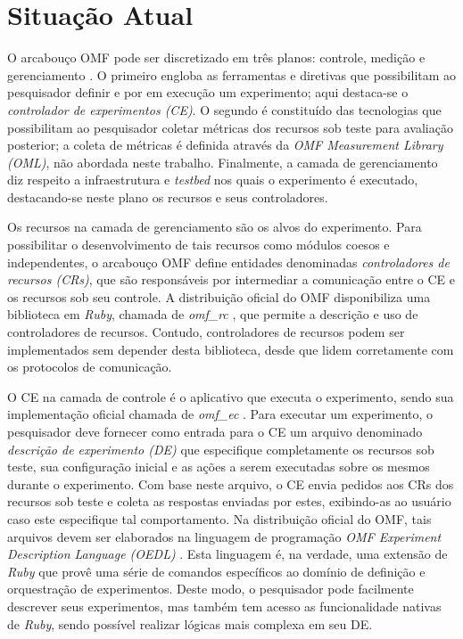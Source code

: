 
\chapter{Situa\c{c}\~ao Atual}

O arcabou\c{c}o OMF pode ser discretizado em tr\^es planos: controle, medi\c{c}\~ao e gerenciamento \cite{Rakotoarivelo2010:OCM:1713254.1713267}. O primeiro engloba as ferramentas e diretivas que possibilitam ao pesquisador definir e por em execu\c{c}\~ao um experimento; aqui destaca-se o \textit{controlador de experimentos (CE)}. O segundo \'e constitu\'ido das tecnologias que possibilitam ao pesquisador coletar m\'etricas dos recursos sob teste para avalia\c{c}\~ao posterior; a coleta de m\'etricas \'e definida atrav\'es da \textit{OMF Measurement Library (OML)}, n\~ao abordada neste trabalho. Finalmente, a camada de gerenciamento diz respeito a infraestrutura e \textit{testbed} nos quais o experimento \'e executado, destacando-se neste plano os recursos e seus controladores.

Os recursos na camada de gerenciamento s\~ao os alvos do experimento. Para possibilitar o desenvolvimento de tais recursos como m\'odulos coesos e independentes, o arcabou\c{c}o OMF define entidades denominadas \textit{controladores de recursos (CRs)}, que s\~ao respons\'aveis por intermediar a comunica\c{c}\~ao entre o CE e os recursos sob seu controle. A distribui\c{c}\~ao oficial do OMF disponibiliza uma biblioteca em \textit{Ruby}, chamada de \textit{omf\_rc} \cite{omf.rc}, que permite a descri\c{c}\~ao e uso de controladores de recursos. Contudo, controladores de recursos podem ser implementados sem depender desta biblioteca, desde que lidem corretamente com os protocolos de comunica\c{c}\~ao.

O CE na camada de controle \'e o aplicativo que executa o experimento, sendo sua implementa\c{c}\~ao oficial chamada de \textit{omf\_ec} \cite{omf.ec}. Para executar um experimento, o pesquisador deve fornecer como entrada para o CE um arquivo denominado \textit{descri\c{c}\~ao de experimento (DE)} que especifique completamente os recursos sob teste, sua configura\c{c}\~ao inicial e as a\c{c}\~oes a serem executadas sobre os mesmos durante o experimento. Com base neste arquivo, o CE envia pedidos aos CRs dos recursos sob teste e coleta as respostas enviadas por estes, exibindo-as ao usu\'ario caso este especifique tal comportamento. Na distribui\c{c}\~ao oficial do OMF, tais arquivos devem ser elaborados na linguagem de programa\c{c}\~ao \textit{OMF Experiment Description Language (OEDL)} \cite{OEDL}. Esta linguagem \'e, na verdade, uma extens\~ao de \textit{Ruby} que prov\^e uma s\'erie de comandos espec\'ificos ao dom\'inio de defini\c{c}\~ao e orquestra\c{c}\~ao de experimentos. Deste modo, o pesquisador pode facilmente descrever seus experimentos, mas tamb\'em tem acesso as funcionalidade nativas de \textit{Ruby}, sendo poss\'ivel realizar l\'ogicas mais complexa em seu DE.

